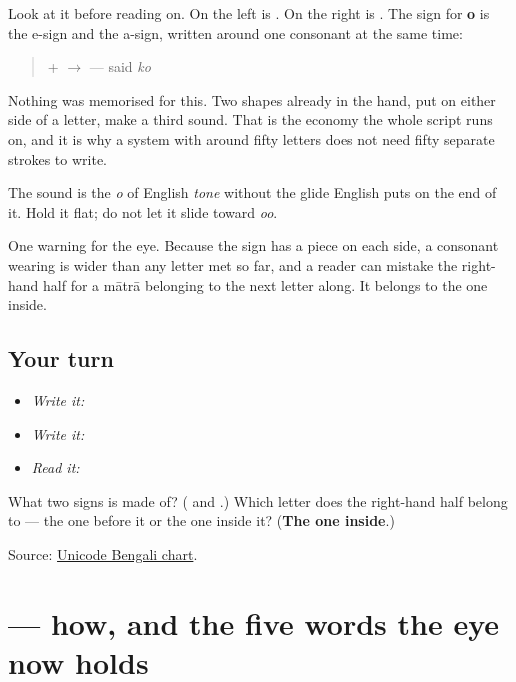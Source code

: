 Look at it before reading on. On the left is \textbf{}. On the right is \textbf{}. The sign for \textbf{o} is the e-sign and the a-sign, written around one consonant at the same time:

\begin{quote}
\textbf{} + \textbf{} $\to$ \textbf{} — said \emph{ko}
\end{quote}

Nothing was memorised for this. Two shapes already in the hand, put on either side of a letter, make a third sound. That is the economy the whole script runs on, and it is why a system with around fifty letters does not need fifty separate strokes to write.

The sound is the \emph{o} of English \emph{tone} without the glide English puts on the end of it. Hold it flat; do not let it slide toward \emph{oo}.

One warning for the eye. Because the sign has a piece on each side, a consonant wearing \textbf{} is wider than any letter met so far, and a reader can mistake the right-hand half for a mātrā belonging to the next letter along. It belongs to the one inside.

\subsection*{Your turn}
\begin{itemize}
\raggedright
  \item \emph{Write it:} 
  \item \emph{Write it:} 
  \item \emph{Read it:} 
\end{itemize}

\begin{tcolorbox}[breakable,colback=teal!4,colframe=teal!35!black,title={Before you move on}]
What two signs is \textbf{} made of? (\textbf{} and \textbf{}.) Which letter does the right-hand half belong to — the one before it or the one inside it? (\textbf{The one inside}.)

Source: \href{https://www.unicode.org/charts/PDF/U0980.pdf}{Unicode Bengali chart}.
\end{tcolorbox}
\section[\texorpdfstring{\bn{কেমন} (kemon)}{কেমন (kemon)}]{ — how, and the five words the eye now holds}

